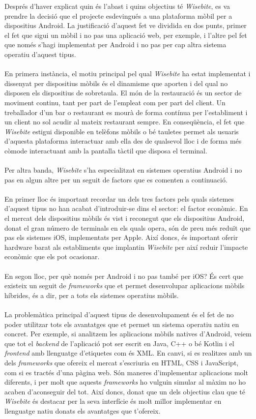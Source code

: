 Després d'haver explicat quin és l'abast i quins objectius té \textit{Wisebite}, es va prendre la decisió que el projecte esdevingués a una plataforma mòbil per a dispositius Android. La justificació d'aquest fet ve dividida en dos punts, primer el fet que sigui un mòbil i no pas una aplicació web, per exemple, i l'altre pel fet que només s'hagi implementat per Android i no pas per cap altra sistema operatiu d'aquest tipus.
\\\\
En primera instància, el motiu principal pel qual \textit{Wisebite} ha estat implementat i dissenyat per dispositius mòbils és el dinamisme que aporten i del qual no disposen els dispositius de sobretaula. El món de la restauració és un sector de moviment continu, tant per part de l'empleat com per part del client. Un treballador d'un bar o restaurant es mourà de forma contínua per l'establiment i un client no sol acudir al mateix restaurant sempre. En conseqüència, el fet que \textit{Wisebite} estigui disponible en telèfons mòbils o bé tauletes permet als usuaris d'aquesta plataforma interactuar amb ella des de qualsevol lloc i de forma més còmode interactuant amb la pantalla tàctil que disposa el terminal.
\\\\
Per altra banda, \textit{Wisebite} s'ha especialitzat en sistemes operatius Android i no pas en algun altre per un seguit de factors que es comenten a continuació.
\\\\
En primer lloc és important recordar un dels tres factors pels quals sistemes d'aquest tipus no han acabat d'introduir-se dins el sector: el factor econòmic. En el mercat dels dispositius mòbils és vist i reconegut que els dispositius Android, donat el gran número de terminals en els quals opera, són de preu més reduït que pas els sistemes iOS, implementats per Apple. Així doncs, és important oferir hardware barat als establiments que implantin \textit{Wisebite} per així reduir l'impacte econòmic que els pot ocasionar.
\\\\
En segon lloc, per què només per Android i no pas també per iOS? És cert que existeix un seguit de \textit{frameworks} que et permet desenvolupar aplicacions mòbils híbrides, és a dir, per a tots els sistemes operatius mòbils.
\\\\
La problemàtica principal d'aquest tipus de desenvolupament és el fet de no poder utilitzar tots els avantatges que et permet un sistema operatiu natiu en concret. Per exemple, si analitzem les aplicacions mòbils natives d'Android, veiem que tot el \textit{backend} de l'aplicació pot ser escrit en Java, C++ o bé Kotlin i el \textit{frontend} amb llenguatge d'etiquetes com és XML. En canvi, si es realitzes amb un dels \textit{frameworks} que ofereix el mercat s'escriuria en HTML, CSS i JavaScript, com si es tractés d'una pàgina web. Són maneres d'implementar aplicacions molt diferents, i per molt que aquests \textit{frameworks} ho vulguin simular al màxim no ho acaben d'aconseguir del tot. Així doncs, donat que un dels objectius clau que té \textit{Wisebite} és destacar per la seva interfície és molt millor implementar en llenguatge natiu donats els avantatges que t'ofereix.
